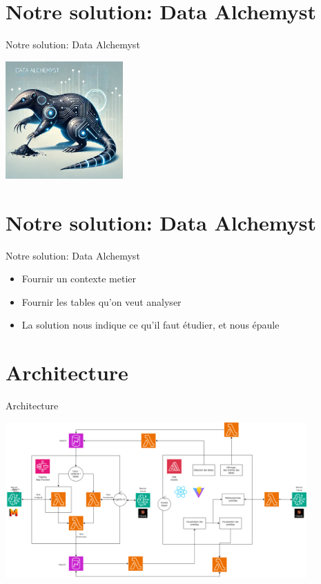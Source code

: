 \documentclass{beamer}
\begin{document}
\section{Notre solution: Data Alchemyst}
\begin{frame}{Notre solution: Data Alchemyst}
\begin{center}
\includegraphics[height=4.5cm]{data_alchemyst.png}
\end{center}
\end{frame}

\section{Notre solution: Data Alchemyst}
\begin{frame}{Notre solution: Data Alchemyst}
	\vspace*{-1cm}
	\begin{itemize}
		\item Fournir un contexte metier
		\item Fournir les tables qu'on veut analyser
		\item La solution nous indique ce qu'il faut étudier, et nous épaule
	\end{itemize}
\end{frame}


\section{Architecture}
\begin{frame}{Architecture}
	\vspace*{-1.5cm}
	\begin{center}
	\includegraphics[height=6cm]{archi_AWS.drawio.png}
	\end{center}
\end{frame}
\end{document}
